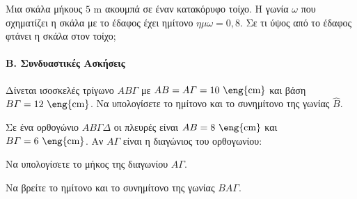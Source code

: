 \documentclass[11pt,a4paper,modern]{FFExercises}
\begin{document}
\askhsh
Μια σκάλα μήκους $5\text{ m}$ ακουμπά σε έναν κατακόρυφο τοίχο. Η γωνία $\omega$ που σχηματίζει η σκάλα με το έδαφος έχει ημίτονο $\eta\mu \omega = 0,8$. Σε τι ύψος από το έδαφος φτάνει η σκάλα στον τοίχο;

\paragraph{Β. Συνδυαστικές Ασκήσεις}

\askhsh
Δίνεται ισοσκελές τρίγωνο $AB\varGamma$ με $AB=A\varGamma=10\text{ \eng{cm}}$ και βάση $B\varGamma=12\text{ \eng{cm}}$. Να υπολογίσετε το ημίτονο και το συνημίτονο της γωνίας $\hat{B}$.
\begin{center}
\end{center}

\askhsh
Σε ένα ορθογώνιο $AB\varGamma\varDelta$ οι πλευρές είναι $AB=8\text{ \eng{cm}}$ και $B\varGamma=6\text{ \eng{cm}}$. Αν $A\varGamma$ είναι η διαγώνιος του ορθογωνίου:
\begin{alist}
    \item Να υπολογίσετε το μήκος της διαγωνίου $A\varGamma$.
    \item Να βρείτε το ημίτονο και το συνημίτονο της γωνίας $\widehat{BA\varGamma}$.
\end{alist}
\begin{center}
\end{center}
\end{document}
